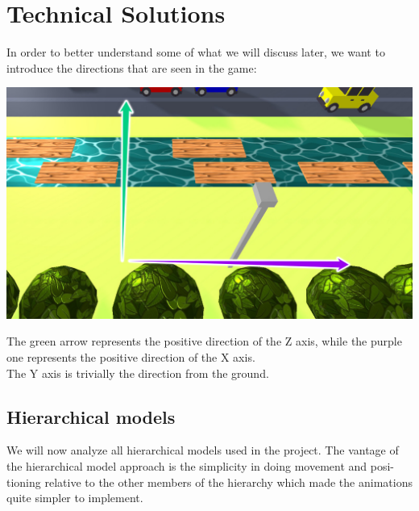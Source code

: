 \documentclass[a4paper, 11pt]{article}
\begin{document}
\section{Technical Solutions}
In order to better understand some of what we will discuss later, we want to introduce the directions that are seen in the game:\\
\begin{center}
	\includegraphics[width =\linewidth]{axis.jpg}\\
\end{center}
The green arrow represents the positive direction of the Z axis, while the purple one represents the positive direction of the X axis.\\ The Y axis is trivially the direction from the ground.
\subsection{Hierarchical models}
We will now analyze all hierarchical models used in the project. The vantage of the hierarchical model approach is the simplicity in doing movement and posi-
tioning relative to the other members of the hierarchy which made the animations quite simpler to implement.
\end{document}
